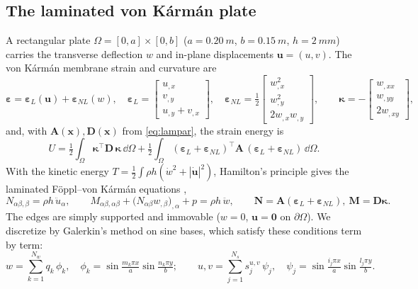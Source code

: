 \subsection{The laminated von K\'arm\'an plate}\label{sec:plate}
A rectangular plate $\Omega=[0,a]\times[0,b]$ ($a=\SI{0.20}{m}$, $b=\SI{0.15}{m}$,
$h=\SI{2}{mm}$) carries the transverse deflection $w$ and in-plane displacements
$\bm u=(u,v)$. The von K\'arm\'an membrane strain and curvature are
\begin{equation}
\bm\varepsilon=\bm\varepsilon_L(\bm u)+\bm\varepsilon_{NL}(w),\quad
\bm\varepsilon_L=\begin{bmatrix}u_{,x}\\v_{,y}\\u_{,y}+v_{,x}\end{bmatrix},\quad
\bm\varepsilon_{NL}=\tfrac12\begin{bmatrix}w_{,x}^2\\w_{,y}^2\\2w_{,x}w_{,y}\end{bmatrix},\qquad
\bm\kappa=-\begin{bmatrix}w_{,xx}\\w_{,yy}\\2w_{,xy}\end{bmatrix},
\label{eq:kin}
\end{equation}
and, with $\bm A(\bm x),\bm D(\bm x)$ from \eqref{eq:lampar}, the strain energy is
\begin{equation}
U=\tfrac12\!\int_\Omega\!\bm\kappa^{\!\top}\bm D\,\bm\kappa\,\dd\Omega
+\tfrac12\!\int_\Omega\!(\bm\varepsilon_L+\bm\varepsilon_{NL})^{\!\top}\bm A\,
(\bm\varepsilon_L+\bm\varepsilon_{NL})\,\dd\Omega .
\label{eq:energy}
\end{equation}
With the kinetic energy $T=\tfrac12\int\rho h(\dot w^2+|\dot{\bm u}|^2)$, Hamilton's
principle gives the laminated F\"oppl--von K\'arm\'an equations \cite{amabili2008},
\begin{equation}
N_{\alpha\beta,\beta}=\rho h\,\ddot u_\alpha,\qquad
M_{\alpha\beta,\alpha\beta}+\big(N_{\alpha\beta}w_{,\beta}\big)_{,\alpha}+p=\rho h\,\ddot w,
\qquad \bm N=\bm A(\bm\varepsilon_L+\bm\varepsilon_{NL}),\ \bm M=\bm D\bm\kappa .
\label{eq:fvk}
\end{equation}
The edges are simply supported and immovable ($w=0$, $\bm u=\bm 0$ on $\partial\Omega$).
We discretize by Galerkin's method on sine bases, which satisfy these conditions term by
term:
\begin{equation}
w=\sum_{k=1}^{N_w}q_k\,\phi_k,\quad \phi_k=\sin\tfrac{m_k\pi x}{a}\sin\tfrac{n_k\pi y}{b};
\qquad
u,v=\sum_{j=1}^{N_s}s^{u,v}_j\,\psi_j,\quad \psi_j=\sin\tfrac{i_j\pi x}{a}\sin\tfrac{l_j\pi y}{b}.
\end{equation}
